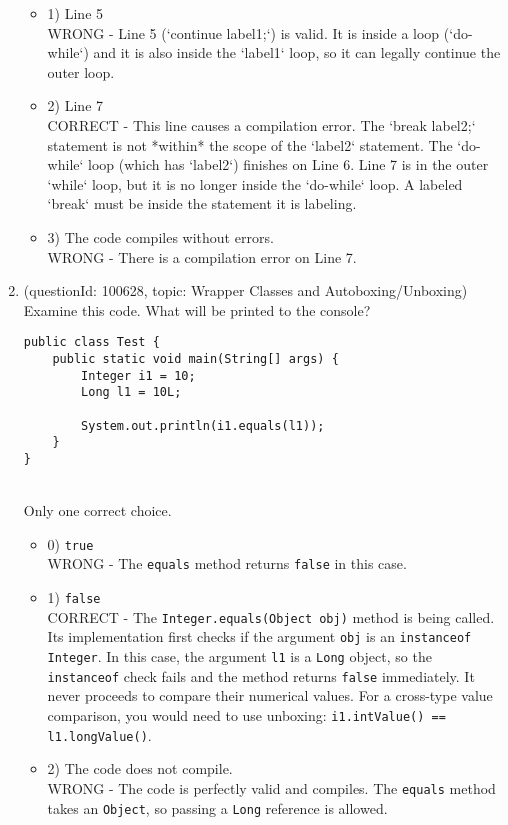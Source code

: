 \documentclass[12pt]{article}
\begin{document}
\begin{enumerate}[label=(\arabic*)]
\begin{itemize}
\item 1) Line 5
 \\ 
WRONG - Line 5 (`continue label1;`) is valid. It is inside a loop (`do-while`) and it is also inside the `label1` loop, so it can legally continue the outer loop.

\item 2) Line 7
 \\ 
CORRECT - This line causes a compilation error. The `break label2;` statement is not *within* the scope of the `label2` statement. The `do-while` loop (which has `label2`) finishes on Line 6. Line 7 is in the outer `while` loop, but it is no longer inside the `do-while` loop. A labeled `break` must be inside the statement it is labeling.

\item 3) The code compiles without errors.
 \\ 
WRONG - There is a compilation error on Line 7.

\end{itemize}
\item (questionId: 100628, topic: Wrapper Classes and Autoboxing/Unboxing) \\ 
Examine this code. What will be printed to the console?\n\begin{verbatim}
public class Test {
    public static void main(String[] args) {
        Integer i1 = 10;
        Long l1 = 10L;
        
        System.out.println(i1.equals(l1));
    }
}
\end{verbatim}
\\ \noindent Only one correct choice. 
\begin{itemize}
\item 0) \verb|true|
 \\ 
WRONG - The \verb|equals| method returns \verb|false| in this case.

\item 1) \verb|false|
 \\ 
CORRECT - The \verb|Integer.equals(Object obj)| method is being called. Its implementation first checks if the argument \verb|obj| is an \verb|instanceof Integer|. In this case, the argument \verb|l1| is a \verb|Long| object, so the \verb|instanceof| check fails and the method returns \verb|false| immediately. It never proceeds to compare their numerical values. For a cross-type value comparison, you would need to use unboxing: \verb|i1.intValue() == l1.longValue()|.

\item 2) The code does not compile.
 \\ 
WRONG - The code is perfectly valid and compiles. The \verb|equals| method takes an \verb|Object|, so passing a \verb|Long| reference is allowed.


\end{itemize}
\end{enumerate}
\end{document}
